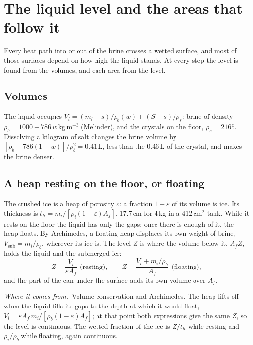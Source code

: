 \documentclass[11pt,a4paper]{article}
\newcommand{\where}{\par\noindent\textit{Where it comes from.}\ }
\begin{document}
\section{The liquid level and the areas that follow it}
\label{sec:level}

Every heat path into or out of the brine crosses a wetted surface, and most of those surfaces depend
on how high the liquid stands. At every step the level is found from the volumes, and each area from
the level.

\subsection{Volumes}
The liquid occupies $V_l = (m_l + s)/\rho_b(w) + (S-s)/\rho_s$: brine of density
$\rho_b = 1000 + 786\,w$\,kg\,m$^{-3}$ (Melinder), and the crystals on the floor, $\rho_s = 2165$. Dissolving
a kilogram of salt changes the brine volume by $[\rho_b - 786(1-w)]/\rho_b^2 = 0.41$\,L, less than the
0.46\,L of the crystal, and makes the brine denser.

\subsection{A heap resting on the floor, or floating}
The crushed ice is a heap of porosity $\varepsilon$: a fraction $1-\varepsilon$ of its volume is ice. Its
thickness is $t_h = m_i/[\rho_i(1-\varepsilon)A_f]$, 17.7\,cm for 4\,kg in a 412\,cm$^2$ tank. While it rests
on the floor the liquid has only the gaps; once there is enough of it, the heap floats. By Archimedes,
a floating heap displaces its own weight of brine, $V_{\text{sub}} = m_i/\rho_b$, wherever its ice is.
The level $Z$ is where the volume below it, $A_f Z$, holds the liquid and the submerged ice:
\begin{equation}
Z = \frac{V_l}{\varepsilon A_f}\ \ \text{(resting)},\qquad
Z = \frac{V_l + m_i/\rho_b}{A_f}\ \ \text{(floating)},
\label{eq:level}
\end{equation}
and the part of the can under the surface adds its own volume over $A_f$. \where Volume conservation
and Archimedes. The heap lifts off when the liquid fills its gaps to the depth at which it would float,
$V_l = \varepsilon A_f\,m_i/[\rho_b(1-\varepsilon)A_f]$; at that point both expressions give the same $Z$, so
the level is continuous. The wetted fraction of the ice is $Z/t_h$ while resting and $\rho_i/\rho_b$ while
floating, again continuous.
\end{document}
